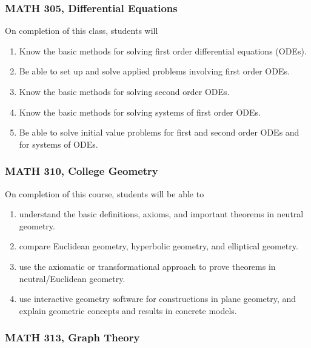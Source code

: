 \documentclass[11pt]{article}
\newenvironment{alphalist}{
\begin{enumerate}[label=(\arabic*),widest=107 ,leftmargin=25pt, itemsep=0pt]}
{\end{enumerate}}
\begin{document}
\subsubsection{MATH 305, Differential Equations}

On completion of this class, students will
\begin{alphalist}
    \item Know the basic methods for solving first order differential equations (ODEs).
    \item Be able to set up and solve applied problems involving first order ODEs.
    \item Know the basic methods for solving second order ODEs.
    \item Know the basic methods for solving systems of first order ODEs.
    \item Be able to solve initial value problems for first and second order ODEs and for systems of ODEs.
\end{alphalist}

\subsubsection{MATH 310, College Geometry}

On completion of this course, students will be able to
\begin{alphalist}
    \item understand the basic definitions, axioms, and important theorems in neutral geometry.
    \item compare Euclidean geometry, hyperbolic geometry, and elliptical geometry.
    \item use the axiomatic or transformational approach to prove theorems in neutral/Euclidean geometry.
    \item use interactive geometry software for constructions in plane geometry, and
    explain geometric concepts and results in concrete models.
\end{alphalist}

\subsubsection{MATH 313, Graph Theory}
\end{document}
